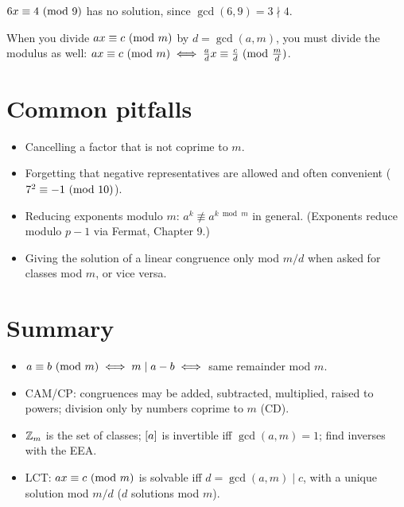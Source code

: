\begin{example}
$6x \equiv 4 \ (\mathrm{mod}\ 9)$ has no solution, since $\gcd(6,9) = 3 \nmid 4$.
\end{example}

\begin{important}
When you divide $ax \equiv c \ (\mathrm{mod}\ m)$ by $d = \gcd(a,m)$, you must divide the modulus as well:
$ax \equiv c \ (\mathrm{mod}\ m) \iff \frac ad x \equiv \frac cd \ (\mathrm{mod}\ \frac md)$.
\end{important}

\section{Common pitfalls}
\begin{itemize}
  \item Cancelling a factor that is not coprime to $m$.
  \item Forgetting that negative representatives are allowed and often convenient
        ($7^2 \equiv -1 \ (\mathrm{mod}\ 10)$).
  \item Reducing exponents modulo $m$: $a^k \not\equiv a^{k \bmod m}$ in general. (Exponents
        reduce modulo $p-1$ via Fermat, Chapter 9.)
  \item Giving the solution of a linear congruence only mod $m/d$ when asked for classes mod $m$,
        or vice versa.
\end{itemize}

\section{Summary}
\begin{itemize}
  \item $a\equiv b \ (\mathrm{mod}\ m) \iff m \mid a - b \iff$ same remainder mod $m$.
  \item CAM/CP: congruences may be added, subtracted, multiplied, raised to powers; division only
        by numbers coprime to $m$ (CD).
  \item $\mathbb{Z}_{m}$ is the set of classes; $[a]$ is invertible iff $\gcd(a,m) = 1$; find inverses
        with the EEA.
  \item LCT: $ax \equiv c \ (\mathrm{mod}\ m)$ is solvable iff $d = \gcd(a,m) \mid c$, with a unique solution
        mod $m/d$ ($d$ solutions mod $m$).
\end{itemize}

